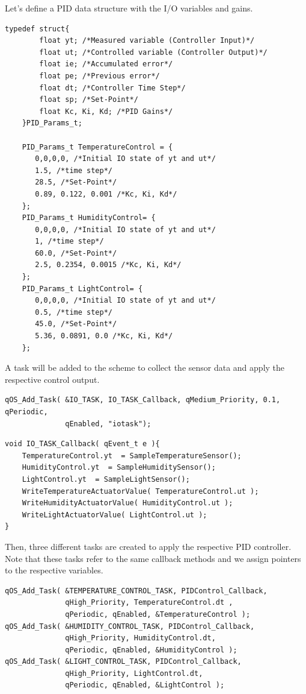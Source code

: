\documentclass{article}
\begin{document}
Let's define a PID data structure with the I/O variables and gains. \\
 
\begin{lstlisting}[style=CStyle]
   typedef struct{
        float yt; /*Measured variable (Controller Input)*/
        float ut; /*Controlled variable (Controller Output)*/
        float ie; /*Accumulated error*/
        float pe; /*Previous error*/
        float dt; /*Controller Time Step*/
        float sp; /*Set-Point*/
        float Kc, Ki, Kd; /*PID Gains*/ 
    }PID_Params_t;
    
    PID_Params_t TemperatureControl = {
       0,0,0,0, /*Initial IO state of yt and ut*/
       1.5, /*time step*/
       28.5, /*Set-Point*/
       0.89, 0.122, 0.001 /*Kc, Ki, Kd*/
    };
    PID_Params_t HumidityControl= {
       0,0,0,0, /*Initial IO state of yt and ut*/
       1, /*time step*/
       60.0, /*Set-Point*/
       2.5, 0.2354, 0.0015 /*Kc, Ki, Kd*/
    };
    PID_Params_t LightControl= {
       0,0,0,0, /*Initial IO state of yt and ut*/
       0.5, /*time step*/
       45.0, /*Set-Point*/
       5.36, 0.0891, 0.0 /*Kc, Ki, Kd*/
    };
\end{lstlisting}

A task will be added to the scheme to collect the sensor data and apply the respective control output. \\

\begin{lstlisting}[style=CStyle]
qOS_Add_Task( &IO_TASK, IO_TASK_Callback, qMedium_Priority, 0.1, qPeriodic, 
              qEnabled, "iotask");
\end{lstlisting}

\begin{lstlisting}[style=CStyle]
void IO_TASK_Callback( qEvent_t e ){
    TemperatureControl.yt  = SampleTemperatureSensor();
    HumidityControl.yt  = SampleHumiditySensor();
    LightControl.yt  = SampleLightSensor();
    WriteTemperatureActuatorValue( TemperatureControl.ut );
    WriteHumidityActuatorValue( HumidityControl.ut );
    WriteLightActuatorValue( LightControl.ut ); 
}
\end{lstlisting}

Then, three different tasks are created to apply the respective PID controller. Note that these tasks refer to the same callback methods and we assign pointers to the respective variables. \\

\begin{lstlisting}[style=CStyle]
qOS_Add_Task( &TEMPERATURE_CONTROL_TASK, PIDControl_Callback,
              qHigh_Priority, TemperatureControl.dt , 
              qPeriodic, qEnabled, &TemperatureControl );
qOS_Add_Task( &HUMIDITY_CONTROL_TASK, PIDControl_Callback, 
              qHigh_Priority, HumidityControl.dt, 
              qPeriodic, qEnabled, &HumidityControl );
qOS_Add_Task( &LIGHT_CONTROL_TASK, PIDControl_Callback, 
              qHigh_Priority, LightControl.dt, 
              qPeriodic, qEnabled, &LightControl );
\end{lstlisting}
\end{document}
